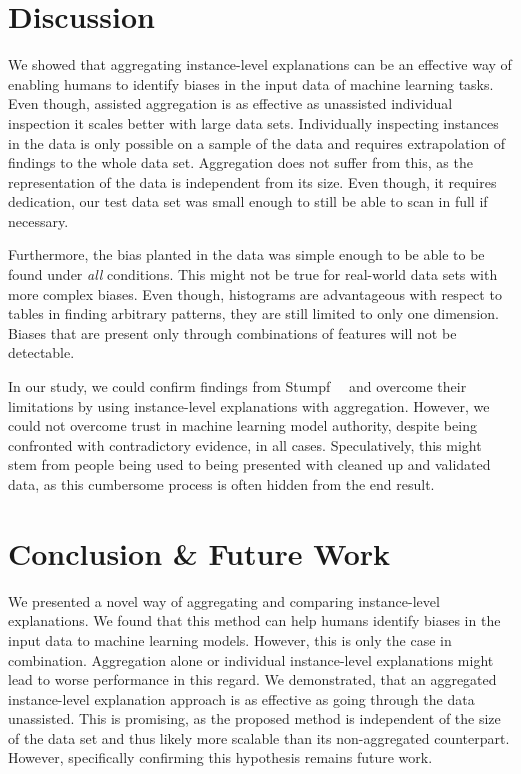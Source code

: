 \section{Discussion}
\label{sec:ag_discussion}
We showed that aggregating instance-level explanations can be an effective way of enabling humans to identify biases in the input data of machine learning tasks.
Even though, assisted aggregation is as effective as unassisted individual inspection it scales better with large data sets.
Individually inspecting instances in the data is only possible on a sample of the data and requires extrapolation of findings to the whole data set.
Aggregation does not suffer from this, as the representation of the data is independent from its size.
Even though, it requires dedication, our test data set was small enough to still be able to scan in full if necessary.

Furthermore, the bias planted in the data was simple enough to be able to be found under \emph{all} conditions.
This might not be true for real-world data sets with more complex biases.
Even though, histograms are advantageous with respect to tables in finding arbitrary patterns, they are still limited to only one dimension.
Biases that are present only through combinations of features will not be detectable.

In our study, we could confirm findings from Stumpf~\etal~\cite{harmful} and overcome their limitations by using instance-level explanations with aggregation.
However, we could not overcome trust in machine learning model authority, despite being confronted with contradictory evidence, in all cases.
Speculatively, this might stem from people being used to being presented with cleaned up and validated data, as this cumbersome process is often hidden from the end result.


\section{Conclusion \& Future Work}
\label{sec:conclusion}
We presented a novel way of aggregating and comparing instance-level explanations.
We found that this method can help humans identify biases in the input data to machine learning models.
However, this is only the case in combination.
Aggregation alone or individual instance-level explanations might lead to worse performance in this regard.
We demonstrated, that an aggregated instance-level explanation approach is as effective as going through the data unassisted.
This is promising, as the proposed method is independent of the size of the data set and thus likely more scalable than its non-aggregated counterpart.
However, specifically confirming this hypothesis remains future work.

